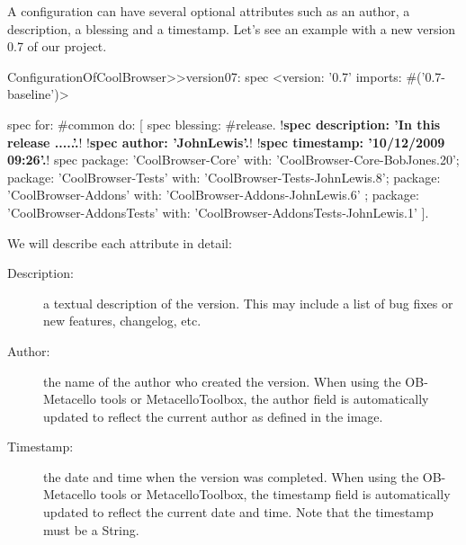 \documentclass[a4paper,10pt,twoside]{book}
\begin{document}

A configuration can have several optional attributes such as
an author, a description, a blessing and a timestamp.  Let's see an example with a new version 0.7 of our project.

\begin{code}{}
ConfigurationOfCoolBrowser>>version07: spec
       <version: '0.7' imports: #('0.7-baseline')>

       spec for: #common do: [
              spec blessing: #release.
              !\textbf{spec description: 'In this release .....'.}!
              !\textbf{spec author: 'JohnLewis'.}!
              !\textbf{spec timestamp: '10/12/2009 09:26'.}!
              spec
                     package: 'CoolBrowser-Core' with: 'CoolBrowser-Core-BobJones.20';
                     package: 'CoolBrowser-Tests' with: 'CoolBrowser-Tests-JohnLewis.8';
                     package: 'CoolBrowser-Addons' with: 'CoolBrowser-Addons-JohnLewis.6' ;
                     package: 'CoolBrowser-AddonsTests' with: 'CoolBrowser-AddonsTests-JohnLewis.1' ].
\end{code}

We will describe each attribute in detail:

\begin{description}

\item[Description:] a textual description of the version. This may include a list of bug fixes or new features, changelog, etc.
\item[Author:] the name of the author who created the version. When using the OB-Metacello tools or MetacelloToolbox, the author field is automatically updated to reflect the current author as defined in the image.
\item[Timestamp:] the date and time when the version was completed. When using the OB-Metacello tools or MetacelloToolbox, the timestamp field is automatically updated to reflect the current date and time. Note that the timestamp must be a String.

\end{description}
\end{document}
